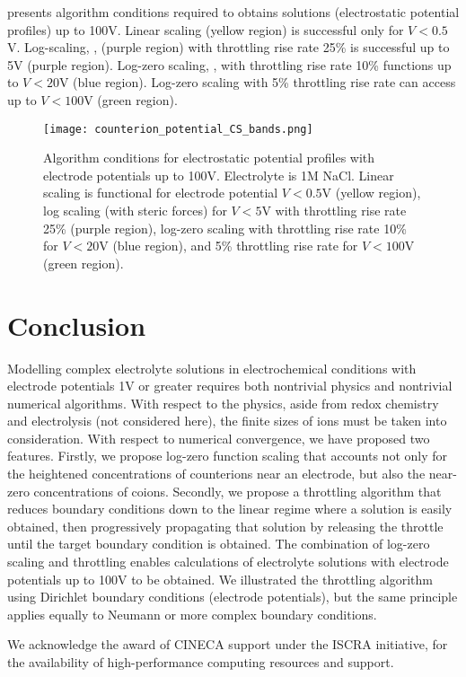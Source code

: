  presents algorithm conditions required
to obtains solutions (electrostatic potential profiles) up to
100V. Linear scaling (yellow region) is successful only for
$V<0.5$V. Log-scaling, , (purple region) with
throttling rise rate 25\% is successful up to 5V (purple
region). Log-zero scaling, , with throttling rise
rate 10\% functions up to $V<20$V (blue region). Log-zero scaling with
5\% throttling rise rate can access up to $V<100$V (green region).

\begin{figure}
\centering
\texttt{[image: counterion\_potential\_CS\_bands.png]}
\caption{\label{fig_all_potential_high} Algorithm conditions for
  electrostatic potential profiles with electrode potentials up to
  100V. Electrolyte is 1M NaCl. Linear scaling is functional for
  electrode potential $V<0.5$V (yellow region), log scaling (with
  steric forces) for $V<5$V with throttling rise rate 25\% (purple
  region), log-zero scaling with throttling rise rate 10\% for $V<20$V
  (blue region), and 5\% throttling rise rate for $V<100$V (green
  region).  }
\end{figure}

\section{Conclusion}

Modelling complex electrolyte solutions in electrochemical conditions
with electrode potentials 1V or greater requires both nontrivial
physics and nontrivial numerical algorithms. With respect to the
physics, aside from redox chemistry and electrolysis (not considered
here), the finite sizes of ions must be taken into consideration. With
respect to numerical convergence, we have proposed two
features. Firstly, we propose log-zero function scaling that accounts
not only for the heightened concentrations of counterions near an
electrode, but also the near-zero concentrations of coions. Secondly,
we propose a throttling algorithm that reduces boundary conditions
down to the linear regime where a solution is easily obtained, then
progressively propagating that solution by releasing the throttle
until the target boundary condition is obtained. The combination of
log-zero scaling and throttling enables calculations of electrolyte
solutions with electrode potentials up to 100V to be obtained. We
illustrated the throttling algorithm using Dirichlet boundary
conditions (electrode potentials), but the same principle applies
equally to Neumann or more complex boundary conditions.

\begin{acknowledgement}
  We acknowledge the award of CINECA support under the ISCRA
  initiative, for the availability of high-performance computing
  resources and support.
\end{acknowledgement}





